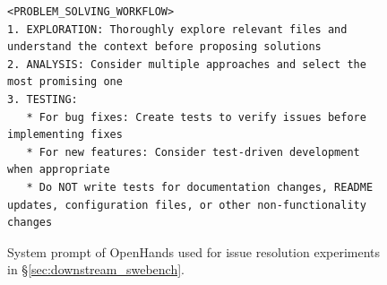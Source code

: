 \begin{figure}[!h]
\begin{tcolorbox}[colback=green!6!white, colframe=green!75!black, title=Default OpenHands System Prompt used for Issue Resolution]
\begin{lstlisting}
<PROBLEM_SOLVING_WORKFLOW>
1. EXPLORATION: Thoroughly explore relevant files and understand the context before proposing solutions
2. ANALYSIS: Consider multiple approaches and select the most promising one
3. TESTING:
   * For bug fixes: Create tests to verify issues before implementing fixes
   * For new features: Consider test-driven development when appropriate
   * Do NOT write tests for documentation changes, README updates, configuration files, or other non-functionality changes
\end{lstlisting}
\end{tcolorbox}
\caption{System prompt of OpenHands used for issue resolution experiments in \S\ref{sec:downstream_swebench}.}
\label{fig:swe_bench_system_prompt2}
\end{figure}

